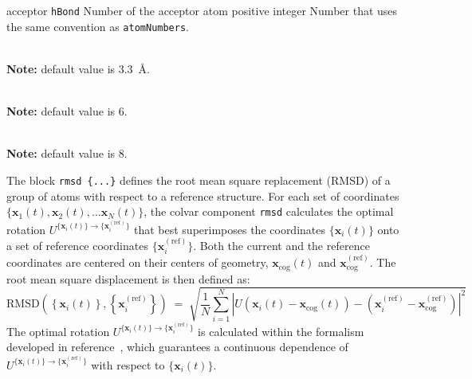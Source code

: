 \begin{cvcoptions}
\item %
  \key
    {acceptor}{%
    \texttt{hBond}}{%
    Number of the acceptor atom}{%
    positive integer}{%
    Number that uses the same convention as \texttt{atomNumbers}.}
\item %
\item %
  \\
  \textbf{Note:} default value is 3.3~\AA.
\item %
  \\
  \textbf{Note:} default value is 6.
\item %
  \\
  \textbf{Note:} default value is 8.
\end{cvcoptions}





The block \texttt{rmsd~\{...\}} defines the root mean square replacement
(RMSD) of a group of atoms with respect to a reference structure.  For
each set of coordinates $\{ \mathbf{x}_1(t), \mathbf{x}_2(t), \ldots
\mathbf{x}_N(t) \}$, the colvar component \texttt{rmsd} calculates the
optimal rotation
$U^{\{\mathbf{x}_{i}(t)\}\rightarrow\{\mathbf{x}_{i}^{\mathrm{(ref)}}\}}$
that best superimposes the coordinates $\{\mathbf{x}_{i}(t)\}$ onto a
set of reference coordinates $\{\mathbf{x}_{i}^{\mathrm{(ref)}}\}$.
Both the current and the reference coordinates are centered on their
centers of geometry, $\mathbf{x}_{\mathrm{cog}}(t)$ and
$\mathbf{x}_{\mathrm{cog}}^{\mathrm{(ref)}}$.  The root mean square
displacement is then defined as:
\begin{equation}
  \label{eq:cvc_rmsd}
  { \mathrm{RMSD}\left(\left\{\mathbf{x}_{i}\left(t\right)\right\},
    \left\{\mathbf{x}_{i}^{\mathrm{(ref)}}\right\}\right) } \; = \; \sqrt{
    \frac{1}{N} \sum_{i=1}^{N} \left|
      U
      \left(\mathbf{x}_{i}(t) - \mathbf{x}_{\mathrm{cog}}(t)\right) -
      \left(\mathbf{x}_{i}^{\mathrm{(ref)}} -
        \mathbf{x}_{\mathrm{cog}}^{\mathrm{(ref)}} \right) \right|^{2} }
\end{equation}
The optimal rotation
$U^{\{\mathbf{x}_{i}(t)\}\rightarrow\{\mathbf{x}_{i}^{\mathrm{(ref)}}\}}$
is calculated within the formalism developed in
reference~\cite{Coutsias2004}, which guarantees a continuous
dependence of
$U^{\{\mathbf{x}_{i}(t)\}\rightarrow\{\mathbf{x}_{i}^{\mathrm{(ref)}}\}}$
with respect to $\{\mathbf{x}_{i}(t)\}$.

